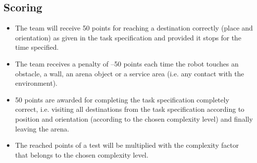 \subsection{Scoring}

\begin{itemize}
\item The team will receive 50 points for reaching a destination correctly (place and orientation) as given in the task specification and provided it stops for the time specified. 
\item The team receives a penalty of –50 points each time the robot touches an obstacle, a wall, an arena object or a service area (i.e. any contact with the environment).
\item 50 points are awarded for completing the task specification completely correct, i.e. visiting all destinations from the task specification according to position and orientation (according to the chosen complexity level) and finally leaving the arena.  
\item The reached points of a test will be multiplied with the complexity factor that belongs to the chosen complexity level.
\end{itemize}
